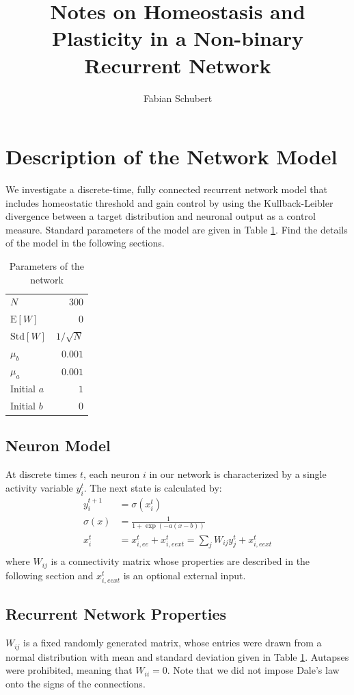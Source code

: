 \documentclass[10pt,a4paper]{article}
\author{Fabian Schubert}
\title{Notes on Homeostasis and Plasticity in a Non-binary Recurrent Network}
\begin{document}
\maketitle





\section{Description of the Network Model}
We investigate a discrete-time, fully connected recurrent network model that includes homeostatic threshold and gain control by using the Kullback-Leibler divergence between a target distribution and neuronal output as a control measure. Standard parameters of the model are given in Table \ref{tab:parameters}. Find the details of the model in the following sections.
\begin{table}
\centering
\caption{Parameters of the network}

\begin{tabular}{l|r}
$N$ & $300$ \\
$\mathrm{E}[W]$ &  $0$\\
$\mathrm{Std}[W]$ & $1/\sqrt{N}$ \\
$\mu_b$ & $0.001$ \\
$\mu_a$ & $0.001$ \\
Initial $a$ & $1$ \\
Initial $b$ & $0$
\end{tabular}
\label{tab:parameters}
\end{table}

\subsection{Neuron Model}
At discrete times $t$, each neuron $i$ in our network is characterized by a single activity variable $y^t_i$. The next state is calculated by:
\begin{align}
y^{t+1}_i &= \sigma\left(x^t_i\right) \\
\sigma\left(x\right) &= \frac{1}{1+\exp\left(-a\left(x-b\right)\right)} \\
x^t_i &= x^t_{i,ee} + x^t_{i,eext} = \sum_j W_{ij} y^t_j  + x^t_{i,eext} \\
\end{align}
where $W_{ij}$ is a connectivity matrix whose properties are described in the following section and $x^t_{i,eext}$ is an optional external input.

\subsection{Recurrent Network Properties}
$W_{ij}$ is a fixed randomly generated matrix, whose entries were drawn from a normal distribution with mean and standard deviation given in Table \ref{tab:parameters}. Autapses were prohibited, meaning that $W_{ii} = 0$. Note that we did not impose Dale's law onto the signs of the connections.
\end{document}
